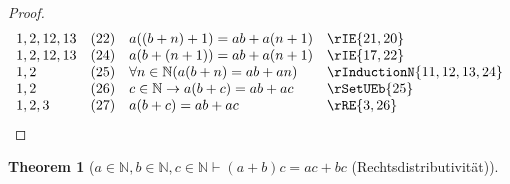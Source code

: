 \documentclass{book}
\theoremstyle{plain}
\newtheorem{theorem}{Theorem}
\theoremstyle{remark}
\theoremstyle{definition}
\begin{document}
\begin{proof}
\[\begin{array}{llll}
            1,2,12,13   &  (22) & a((b+n)+1)=ab+a(n+1) & \rIE{21,20} \\
            1,2,12,13   &  (24) & a(b+(n+1))=ab+a(n+1) & \rIE{17,22} \\
            1,2         &  (25) & \forall n\in\mathbb{N}(a(b+n)=ab+an) & \rInductionN{11,12,13,24} \\
            1,2         &  (26) & c\in\mathbb{N}\rightarrow a(b+c)=ab+ac & \rSetUEb{25} \\
            1,2,3       &  (27) & a(b+c)=ab+ac & \rRE{3,26} \\
        \end{array}
	\]
\end{proof}

\label{aInNaturalwbInNaturalwcInNaturalImpLpaPlusbRpcEqualsacPlusbc}
\begin{theorem}[\(a\in\mathbb{N},b\in\mathbb{N},c\in\mathbb{N}\vdash (a+b)c=ac+bc\) (Rechtsdistributivität)]
\end{theorem}
\end{document}
